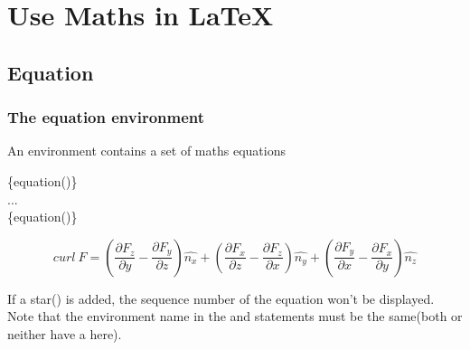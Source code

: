 \section{Use Maths in \LaTeX}
\begin{frame}
\end{frame}

\subsection{Equation}

\begin{frame}
	\frametitle{The equation environment}
	An  environment contains a set of maths equations
	\begin{command}
		\{equation(\structure{*})\}\\
		\qquad ...\\
		\{equation(\structure{*})\}\\
	\end{command}
	\begin{example}
		\begin{equation}
		curl\ F=\left(\frac{\partial F_z}{\partial y}-\frac{\partial F_y}{\partial z}\right)\hat{n_x}+\left(\frac{\partial F_x}{\partial z}-\frac{\partial F_z}{\partial x}\right)\hat{n_y}+\left(\frac{\partial F_y}{\partial x}-\frac{\partial F_x}{\partial y}\right)\hat{n_z}
		\end{equation}
	\end{example}
	If a star(\structure{*}) is added, the sequence number of the equation won't be displayed. Note that the environment name in the  and  statements must be the same(both or neither have a \structure{*} here).
\end{frame}

